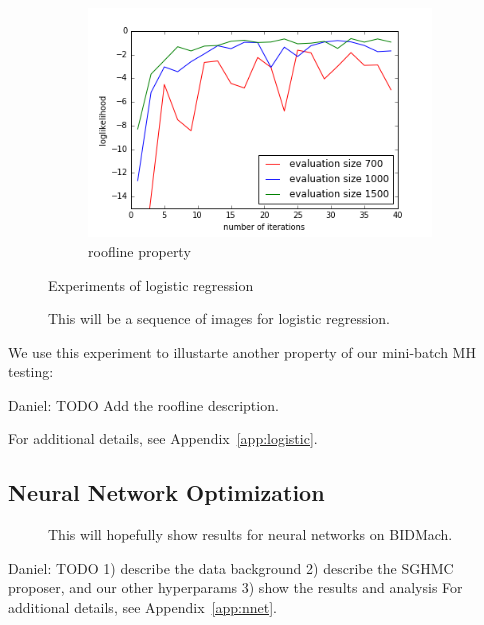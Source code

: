 \documentclass{article}
\begin{document}
\begin{figure}
\begin{subfigure}[b]{0.32\textwidth}
        \includegraphics[width=\textwidth]{./figures/roofline_hyc.png}
        \caption{roofline property}
        \label{fig:logistic_roof}
    \end{subfigure}
    \caption{Experiments of logistic regression}\label{fig:logistic}
\end{figure}

\begin{figure}[ht]
  \centering
  \fbox{\rule[-.5cm]{0cm}{4cm} \rule[-.5cm]{4cm}{0cm}}
  \caption{This will be a sequence of images for logistic regression.}
\end{figure}

We use this experiment to illustarte another property of our mini-batch MH testing: 

{\color{blue}
Daniel: TODO
Add the roofline description.

For additional details, see Appendix~\ref{app:logistic}.
}

\subsection{Neural Network Optimization}\label{ssec:nets}

\begin{figure}[ht]
  \centering
  \fbox{\rule[-.5cm]{0cm}{4cm} \rule[-.5cm]{4cm}{0cm}}
  \caption{This will hopefully show results for neural networks on BIDMach.}
\end{figure}

{\color{blue}
Daniel: TODO
1) describe the data background
2) describe the SGHMC proposer, and our other hyperparams
3) show the results and analysis
For additional details, see Appendix~\ref{app:nnet}.
}
\end{document}
